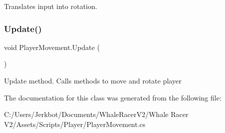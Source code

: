 Translates input into rotation. 

\mbox{\label{class_player_movement_aaf9b77d7177d538be9c1447d08191322}} 
\subsubsection{\texorpdfstring{Update()}{Update()}}
{\footnotesize\ttfamily void Player\+Movement.\+Update (\begin{DoxyParamCaption}{ }\end{DoxyParamCaption})\hspace{0.3cm}{\ttfamily [private]}}



Update method. Calls methods to move and rotate player 



The documentation for this class was generated from the following file\+:\begin{DoxyCompactItemize}
\item 
C\+:/\+Users/\+Jerkbot/\+Documents/\+Whale\+Racer\+V2/\+Whale Racer V2/\+Assets/\+Scripts/\+Player/Player\+Movement.\+cs\end{DoxyCompactItemize}
